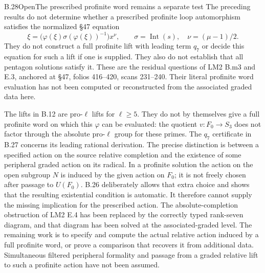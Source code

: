 \begin{statement}{B.28}{Open}{The prescribed profinite word remains a separate test}
The preceding results do not determine whether a prescribed profinite
loop automorphism satisfies the normalized \S47 equation
\[
 \xi=\bigl(\varphi(\xi)\sigma(\varphi(\xi))^{-1}\bigr)x^\nu,
 \qquad \sigma=\operatorname{Int}(s),\quad \nu=(\mu-1)/2.
\]
They do not construct a full profinite lift with leading term $q_7$
or decide this equation for such a lift if one is supplied. They also
do not establish that all pentagon solutions satisfy it.
These are the residual questions of LM2 B.m3 and E.3, anchored at
\S47, folios 416--420, scans 231--240. Their literal profinite
word evaluation has not been computed or reconstructed from the
associated graded data here.
\end{statement}
The lifts in B.12 are pro-$\ell$ lifts for $\ell\ge5$. They do not by
themselves give a full profinite word on which this $\varphi$ can be
evaluated: the quotient $v:F_0\to S_3$ does not factor through the
absolute pro-$\ell$ group for these primes. The $q_7$ certificate in
B.27 concerns its leading rational derivation.
The precise distinction is between a specified action on the source
relative completion and the existence of some peripheral graded action
on its radical. In a profinite solution the action on the open subgroup
$N$ is induced by the given action on $F_0$; it is not freely chosen
after passage to $U(F_0)$. B.26 deliberately allows that extra choice
and shows that the resulting existential condition is automatic. It
therefore cannot supply the missing implication for the prescribed
action. The absolute-completion obstruction of LM2 E.4 has been
replaced by the correctly typed rank-seven diagram, and that diagram
has been solved at the associated-graded level. The remaining work is
to specify and compute the actual relative action induced by a full
profinite word, or prove a comparison that recovers it from additional
data. Simultaneous filtered peripheral formality and passage from a
graded relative lift to such a profinite action have not been assumed.
